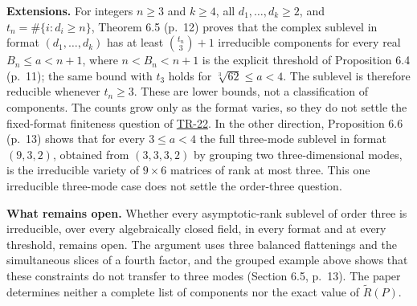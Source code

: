 \documentclass[11pt,a4paper]{article}
\begin{document}
\textbf{Extensions.} For integers \(n\geq3\) and \(k\geq4\), all
\(d_1,\ldots,d_k\geq2\), and \(t_n=\#\{i:d_i\geq n\}\), Theorem 6.5
(p.~12) proves that the complex sublevel in format \((d_1,\ldots,d_k)\)
has at least \(\binom{t_n}{3}+1\) irreducible components for every real
\(B_n\leq a< n+1\), where \(n< B_n< n+1\) is the explicit threshold of
Proposition 6.4 (p.~11); the same bound with \(t_3\) holds for
\(\sqrt[3]{62}\leq a<4\). The sublevel is therefore reducible whenever
\(t_n\geq3\). These are lower bounds, not a classification of
components. The counts grow only as the format varies, so they do not
settle the fixed-format finiteness question of
\href{https://github.com/ajt60gaibb/OpenProblemsInNLA/blob/main/tensor-computations/TR-22/README.md}{TR-22}.
In the other direction, Proposition 6.6 (p.~13) shows that for every
\(3\leq a<4\) the full three-mode sublevel in format \((9,3,2)\),
obtained from \((3,3,3,2)\) by grouping two three-dimensional modes, is
the irreducible variety of \(9\times6\) matrices of rank at most three.
This one irreducible three-mode case does not settle the order-three
question.

\textbf{What remains open.} Whether every asymptotic-rank sublevel of
order three is irreducible, over every algebraically closed field, in
every format and at every threshold, remains open. The argument uses
three balanced flattenings and the simultaneous slices of a fourth
factor, and the grouped example above shows that these constraints do
not transfer to three modes (Section 6.5, p.~13). The paper determines
neither a complete list of components nor the exact value of
\(\widetilde R(P)\).
\end{document}
